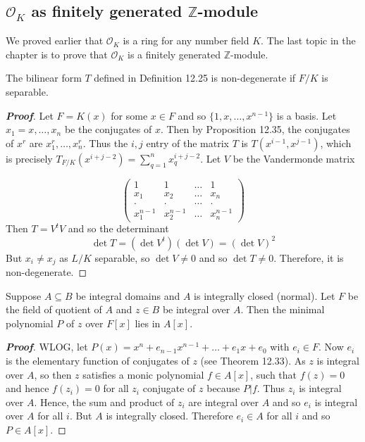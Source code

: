 \subsection{$\mathcal{O}_K$ as finitely generated $\mathbb{Z}$-module}
We proved earlier that $\mathcal{O}_K$ is a ring for any number field $K$. The last topic in the chapter is to prove that $\mathcal{O}_K$ is a finitely generated $\mathbb{Z}$-module.
\begin{lemma} The bilinear form $T$ defined in Definition 12.25 is non-degenerate if $F/K$ is separable.
\end{lemma}
\begin{proof}[\bf Proof] Let $F=K(x)$ for some $x \in F$ and so $\{1,x,\ldots,x^{n-1}\}$ is a basis. Let $x_1=x,\ldots,x_n$ be the conjugates of $x$. Then by Proposition 12.35, the conjugates of $x^r$ are $x^r_1,\ldots,x^r_n$.
Thus the $i,j$ entry of the matrix $T$ is $T(x^{i-1},x^{j-1})$, which is precisely $T_{F/K}(x^{i+j-2})=\sum_{q=1}^n x^{i+j-2}_q$. Let $V$ be the Vandermonde  matrix

\begin{equation*} \begin{pmatrix} 1&1&\ldots&1 \\ x_1 &x_2 &\ldots& x_n \\ .&.&\ldots&. \\ x^{n-1}_1 &x^{n-1}_2 &\ldots & x^{n-1}_n \end{pmatrix} \end{equation*}
Then $T=V^t V$ and so the determinant
$$\det{T}=(\det{V^t})(\det{V})=(\det{V})^2$$
But $x_i \neq x_j$ as $L/K$ separable, so $\det{V} \neq 0$ and so $\det{T} \neq 0$. Therefore, it is non-degenerate.
\end{proof}
\begin{lemma} Suppose $A \subseteq B$ be integral domains and $A$ is integrally closed (normal). Let $F$ be the field of quotient of $A$ and $z \in B$ be integral over $A$. Then the minimal polynomial $P$ of $z$ over $F[x]$ lies in $A[x]$.
\end{lemma}
\begin{proof}[\bf Proof] WLOG, let $P(x)=x^n+e_{n-1}x^{n-1}+\ldots+e_1x+e_0$ with $e_i \in F$. Now $e_i$ is the elementary function of conjugates of $z$ (see Theorem 12.33). As $z$ is integral over $A$, so then $z$ satisfies a monic polynomial $f \in A[x]$, such that $f(z)=0$ and hence $f(z_i)=0$ for all $z_i$ conjugate of $z$ because
$P|f$. Thus $z_i$ is integral over $A$. Hence, the sum and product of $z_i$ are integral over $A$ and so $e_i$ is integral over $A$ for all $i$. But $A$ is integrally closed. Therefore $e_i \in A$ for all $i$ and so $P \in A[x]$.
\end{proof}
